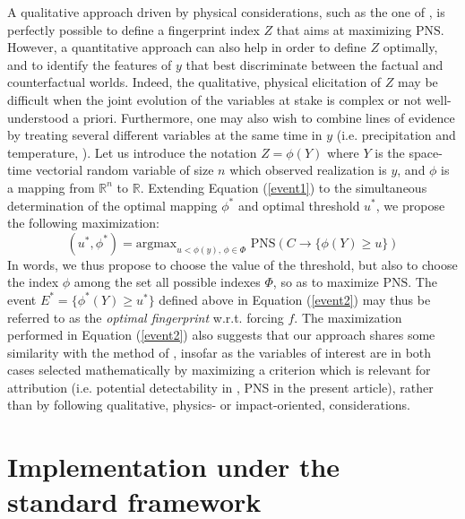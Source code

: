 \documentclass[12pt]{article}
\newcommand{\PNS}{\textrm{PNS}}
\begin{document}
A qualitative approach driven by physical considerations, such as the one of \cite{MB13}, is perfectly possible to define a fingerprint index $Z$ that aims at maximizing $\PNS$. However, a quantitative approach can also help in order to define $Z$ optimally, and to identify the features of $y$ that best discriminate between the factual and counterfactual worlds. Indeed, the qualitative, physical elicitation of $Z$ may be difficult when the joint evolution of the variables at stake is complex or not well-understood a priori. Furthermore, one may also wish to combine lines of evidence by treating several different variables at the same time in $y$ (i.e. precipitation and temperature, \cite{Yan16}). %
Let us introduce the notation $Z=\phi(Y)$ where $Y$ is the space-time vectorial random variable of size $n$ which observed realization is $y$, and $\phi$ is a mapping from $\mathbb{R}^n$ to $\mathbb{R}$. Extending Equation (\ref{event1}) to the simultaneous determination of the optimal mapping $\phi^*$ and optimal threshold $u^*$, we propose the following maximization:
\begin{equation}
\label{event2}
(u^*,\phi^*) = \textrm{argmax}_{u<\phi(y), \,\phi \in \Phi}\,\,\PNS(C\rightarrow \{\phi(Y)\geq u\})
\end{equation}
In words, we thus propose to choose the value of the threshold, but also to choose the index $\phi$ among the set all possible indexes $\Phi$, so as to maximize $\PNS$.
The event $E^* = \{\phi^*(Y)\geq u^*\}$ defined above in Equation (\ref{event2}) may thus be referred to as the \textit{optimal fingerprint} w.r.t. forcing $f$. The maximization performed in Equation (\ref{event2}) also suggests that our approach shares some similarity with the method of \cite{Yan16}, insofar as the variables of interest are in both cases selected mathematically by maximizing a criterion which is relevant for attribution (i.e. potential detectability in \cite{Yan16}, PNS in the present article), rather than by following qualitative, physics- or impact-oriented, considerations. %

\section{Implementation under the standard framework}
\end{document}
